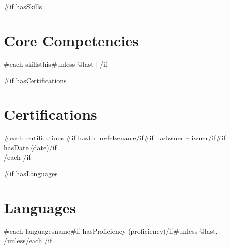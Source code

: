 \documentclass[11pt,a4paper]{article}
\begin{document}
{{#if hasSkills}}
\section*{Core Competencies}
{{#each skills}}{{this}}{{#unless @last}} \quad $\vert$ 
{{/if}}

{{#if hasCertifications}}
\section*{Certifications}
{{#each certifications}}
{{#if hasUrl}}{{href}}{{else}}{{name}}{{/if}}{{#if hasIssuer}} -- {{issuer}}{{/if}}{{#if hasDate}} ({{date}}){{/if}}\\
{{/each}}
{{/if}}

{{#if hasLanguages}}
\section*{Languages}
{{#each languages}}{{name}}{{#if hasProficiency}} ({{proficiency}}){{/if}}{{#unless @last}}, {{/unless}}{{/each}}
{{/if}}
\end{document}
